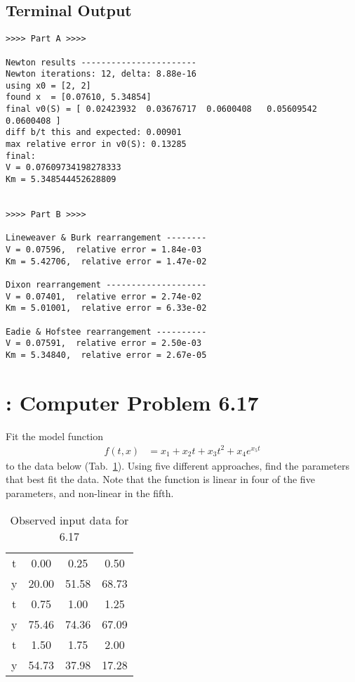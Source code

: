 \documentclass[paper=a4, fontsize=11pt]{scrartcl}
\numberwithin{equation}{section}		%
\numberwithin{figure}{section}			%
\numberwithin{table}{section}				%
\begin{document}
\subsection{Terminal Output}
\begin{verbatim}
>>>> Part A >>>>

Newton results -----------------------
Newton iterations: 12, delta: 8.88e-16
using x0 = [2, 2]
found x  = [0.07610, 5.34854]
final v0(S) = [ 0.02423932  0.03676717  0.0600408   0.05609542  0.0600408 ]
diff b/t this and expected: 0.00901
max relative error in v0(S): 0.13285
final:
V = 0.07609734198278333
Km = 5.348544452628809


>>>> Part B >>>>

Lineweaver & Burk rearrangement --------
V = 0.07596,  relative error = 1.84e-03
Km = 5.42706,  relative error = 1.47e-02

Dixon rearrangement --------------------
V = 0.07401,  relative error = 2.74e-02
Km = 5.01001,  relative error = 6.33e-02

Eadie & Hofstee rearrangement ----------
V = 0.07591,  relative error = 2.50e-03
Km = 5.34840,  relative error = 2.67e-05
\end{verbatim}


\vspace{4mm}
\section{: Computer Problem 6.17}
Fit the model function
\begin{align*}
	f(t,x) &= x_1 + x_2 t + x_3 t^2 + x_4 e^{x_5 t}
\end{align*}
to the data below (Tab.~\ref{tab:6.17input}). Using five different approaches, find the parameters that best fit the data. Note that the function is linear in four of the five parameters, and non-linear in the fifth.
\begin{table}[!hbt]
	\begin{center}
		\caption{Observed input data for 6.17}
		\label{tab:6.17input}
		\begin{tabular}{ c|c c c }
			\hline
			t & 0.00 & 0.25 & 0.50 \\
			y & 20.00 & 51.58 & 68.73 \\
			\hline
			t & 0.75 & 1.00 & 1.25 \\
			y & 75.46 & 74.36 & 67.09 \\
			\hline
			t & 1.50 &1.75 & 2.00 \\
			y & 54.73 & 37.98 & 17.28 \\
			\hline
		\end{tabular}
	\end{center}
\end{table}
\end{document}
